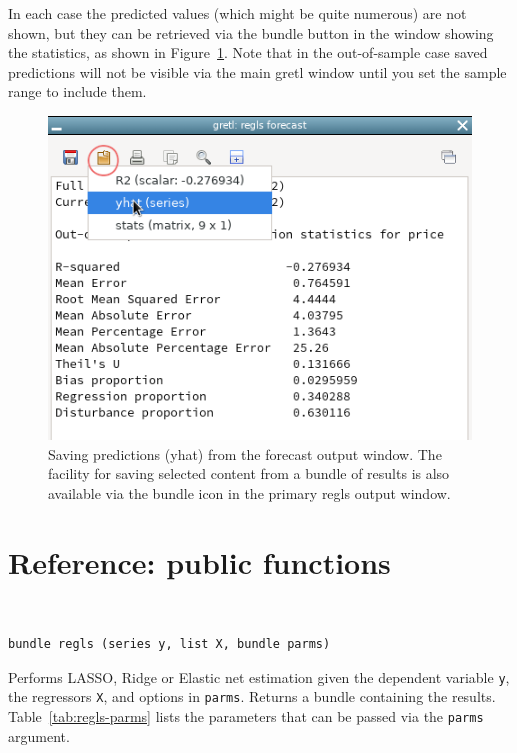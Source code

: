 \documentclass{article}
\newenvironment{funcdoc}
{\noindent\hrulefill\\[-12pt]}
{\medbreak}
\begin{document}
In each case the predicted values (which might be quite numerous) are
not shown, but they can be retrieved via the bundle button in the
window showing the statistics, as shown in
Figure~\ref{fig:fcast-window}. Note that in the out-of-sample case
saved predictions will not be visible via the main gretl window until
you set the sample range to include them.


\begin{figure}[htbp]
  \begin{center}
  \includegraphics[scale=0.6]{fcast_series}
  \caption{Saving predictions (yhat) from the forecast output window.
    The facility for saving selected content from a bundle of results
    is also available via the bundle icon in the primary regls output
    window.}
  \label{fig:fcast-window}
  \end{center}
\end{figure}

\clearpage

\section{Reference: public functions}
\label{sec:funcref}

\begin{funcdoc}
\begin{verbatim}
bundle regls (series y, list X, bundle parms)
\end{verbatim}
  Performs LASSO, Ridge or Elastic net estimation given the dependent
  variable \texttt{y}, the regressors \texttt{X}, and options in
  \texttt{parms}. Returns a bundle containing the
  results. Table~\ref{tab:regls-parms} lists the parameters that can
  be passed via the \texttt{parms} argument.
\end{funcdoc}
\end{document}
